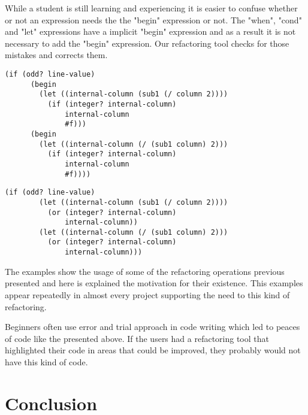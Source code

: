 While a student is still learning and experiencing it is easier to confuse whether
or not an expression needs the the "begin" expression or not.
The "when", "cond" and "let" expressions have a implicit "begin" expression and
as a result it is not necessary to add the "begin" expression.
Our refactoring tool checks for those mistakes and corrects them.
\begin{lstlisting}[basicstyle=\ttfamily]
  (if (odd? line-value)
      (begin
        (let ((internal-column (sub1 (/ column 2))))
          (if (integer? internal-column)
              internal-column
              #f)))
      (begin
        (let ((internal-column (/ (sub1 column) 2)))
          (if (integer? internal-column)
              internal-column
              #f))))
\end{lstlisting}
\begin{lstlisting}[basicstyle=\ttfamily]
  (if (odd? line-value)
        (let ((internal-column (sub1 (/ column 2))))
          (or (integer? internal-column)
              internal-column))
        (let ((internal-column (/ (sub1 column) 2)))
          (or (integer? internal-column)
              internal-column)))
\end{lstlisting}






The examples show the usage of some of the refactoring operations previous presented
and here is explained the motivation for their existence.
This examples appear repeatedly in almost every project supporting the need to
this kind of refactoring.

Beginners often use error and trial approach in code writing which led %
to peaces of code like the presented above.
If the users had a refactoring tool that highlighted their code in areas that
could be improved, they probably would not have this kind of code.


\section{Conclusion}




